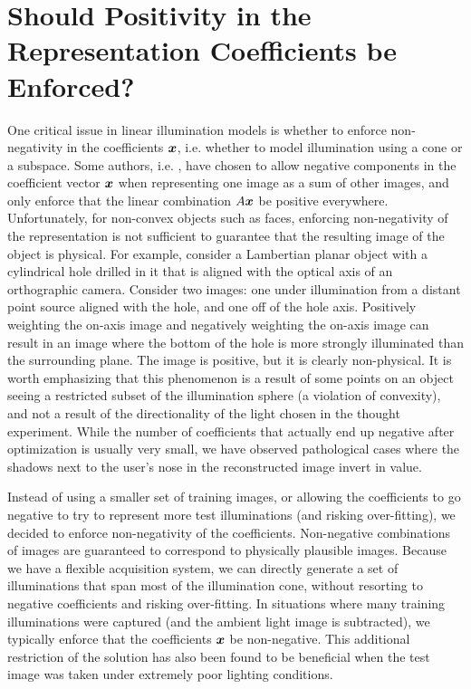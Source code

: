 \section{Should Positivity in the Representation Coefficients
be Enforced?} 
\label{sec:positivity}
One critical issue in linear illumination models
is whether to enforce non-negativity in the coefficients ${\boldsymbol{x}}$,
i.e. whether to model illumination using a cone or a subspace.
Some authors, i.e. \cite{Basri2003-PAMI}, have chosen to allow
negative components in the coefficient vector ${\boldsymbol{x}}$ when
representing one image as a sum of other images, and only
enforce that the linear combination $A{\boldsymbol{x}}$ be positive
everywhere.  Unfortunately, for non-convex objects such as
faces, enforcing non-negativity of the representation is not
sufficient to guarantee that the resulting image of the object
is physical.  For example, consider a Lambertian planar object
with a cylindrical hole drilled in it that is aligned with the
optical axis of an orthographic camera.  Consider two images:
one under illumination from a distant point source aligned with
the hole, and one off of the hole axis.  Positively weighting
the on-axis image and negatively weighting the on-axis image
can result in an image where the bottom of the hole is more
strongly illuminated than the surrounding plane.  The image is
positive, but it is clearly non-physical.  It is worth
emphasizing that this phenomenon is a result of some points on
an object seeing a restricted subset of the illumination sphere
(a violation of convexity),  and not a result of the
directionality of the light chosen in the thought experiment.
While the number of coefficients that actually end up negative
after optimization is usually very small, we have observed
pathological cases where the shadows next to the user's nose in
the reconstructed image invert in value.

Instead of using a smaller set of training images, or allowing the coefficients
to go negative to try to represent more test illuminations (and risking
over-fitting), we decided to enforce non-negativity of the coefficients.
Non-negative combinations of images are guaranteed to correspond to physically
plausible images.  Because we have a flexible acquisition system, we can
directly generate a set of illuminations that span most of the illumination
cone, without resorting to negative coefficients and risking over-fitting.  In
situations where many training illuminations were captured (and the ambient
light image is subtracted), we typically enforce that the coefficients ${\boldsymbol{x}}$ be
non-negative.  This additional restriction of the solution has also been found
to be beneficial when the test image was taken under extremely poor lighting
conditions.


